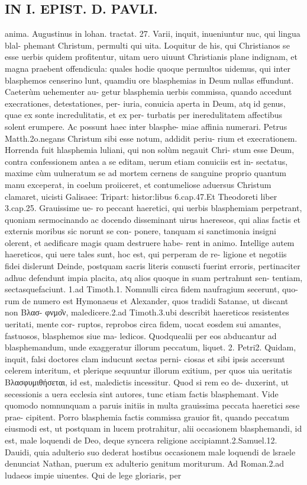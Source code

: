 \documentclass{article}
\begin{document}
\begin{pages}
\section*{IN I. EPIST. D. PAVLI. }
\marginpar{[ p.37 ]}\pstart anima. Augustinus in lohan. tractat. 27. Varii, inquit, inueniuntur nuc, qui lingua blal- phemant Christum, permulti qui uita. Loquitur de his, qui Christianos se esse uerbis quidem profitentur, uitam uero uiuunt Christianis plane indignam, et magna praebent offendicula: quales hodie quoque  permultos uidemus, qui inter blasphemos censerino lunt, quamdiu ore blasphemias in Deum nullas effundunt. Caeterùm uehementer au- getur blasphemia uerbis commissa, quando accedunt execrationes, detestationes, per- iuria, conuicia aperta in Deum, atq id genus, quae ex sonte incredulitatis, et ex per- turbatis per ineredulitatem affectibus solent erumpere. Ac possunt haec inter blasphe- miae affinia numerari. Petrus Matth.2o.negans Christum sibi esse notum, addidit periu- rium et execrationem. Horrenda fuit hlasphemia luliani, qui non solùm negauit Chri- stum esse Deum, contra confessionem antea a se editam, uerum etiam conuiciis est in- sectatus, maxime cùm uulneratum se ad mortem cernens de sanguine proprio quantum manu exceperat, in coelum proiiceret, et contumeliose aduersus Christum clamaret, uicisti Galisaee: Tripart: histor:libus 6.cap.47.Et Theodoreti liber 3.cap.25. Grauissime ue- ro peccant haeretici, qui uerbis blasphemiam perpetrant, quoniam sermocinando ac docendo disseminant uirus haereseos, qui alias factis et externis moribus sic norunt se con- ponere, tanquam si sanctimonia insigni olerent, et aedificare magis quam destruere habe- rent in animo. Intellige autem haereticos, qui uere tales sunt, hoc est, qui perperam de re- ligione et negotiis fidei dislerunt Deinde, postquam sacris literis conuscti fuerint erroris, pertinaciter adhuc defendunt impia placita, atq alios quoque  in suam pertrahunt sen-   tentiam, sectasquefaciunt. 1.ad Timoth.1. Nomnulli circa fidem naufragium secerunt, quo-   rum de numero est Hymonaeus et Alexander, quos tradidi Satanae, ut discant non Βλασ- φνμο͂ν, maledicere.2.ad Timoth.3.ubi describit haereticos resistentes ueritati, mente cor- ruptos, reprobos circa fidem, uocat eosdem sui amantes, fastuosos, blasphemos siue ma- ledicos. Quodquealii per eos abducantur ad blasphemandum, unde exaggeratur illorum   peccatum, liquet. 2. Petri2. Quidam, inquit, falsi doctores clam inducunt sectas perni-   ciosas et sibi ipsis accersunt celerem interitum, et plerique  sequuntur illorum exitium,   per quos uia ueritatis Βλασφυμιθήσεται, id est, maledictis incessitur. Quod si rem eo de- duxerint, ut secessionis a uera ecclesia sint autores, tunc etiam factis blasphemant. Vide quomodo nomnunquam a paruis initiis in multa grauissima peccata haeretici sese prae- cipitent. Porro blasphemia factis commissa grauior fit, quando peccatum eiusmodi est, ut postquam in lucem protrahitur, alii occasionem blasphemandi, id est, male loquendi de Deo, deque  syncera religione accipiamnt.2.Samuel.12. Dauidi, quia adulterio suo dederat hostibus occasionem male loquendi de lsraele denunciat Nathan, puerum ex adulterio genitum moriturum. Ad Roman.2.ad ludaeos impie uiuentes. Qui de lege gloriaris, per 
\end{pages}
\end{document}
